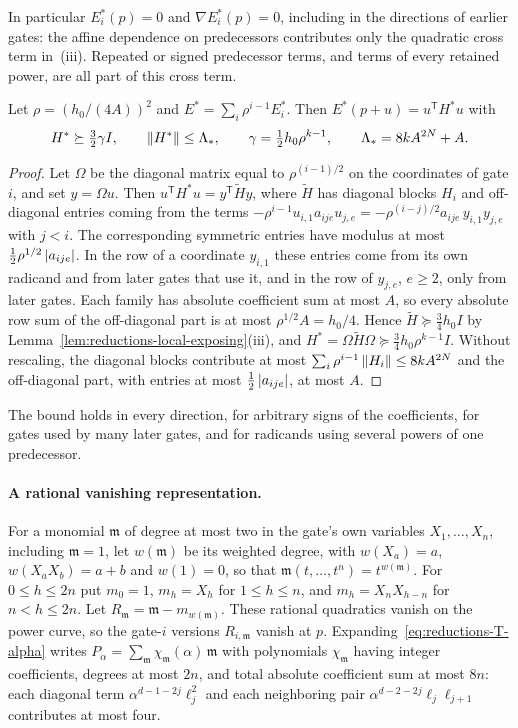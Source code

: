 In particular $E_i^*(p)=0$ and $\nabla E_i^*(p)=0$, including in the directions
of earlier gates: the affine dependence on predecessors contributes only the
quadratic cross term in~(iii). Repeated or signed predecessor terms, and terms
of every retained power, are all part of this cross term.

\begin{lemma}
\label{lem:reductions-coupled}
Let $\rho=(h_0/(4A))^2$ and $E^*=\sum_i\rho^{i-1}E_i^*$. Then
$E^*(p+u)=u^{\mathsf T}H^*u$ with
\[
 H^*\succeq\tfrac32\gamma I,\qquad \left\lVert H^*\right\rVert\le\Lambda_*,
 \qquad \gamma=\tfrac12h_0\rho^{k-1},\qquad \Lambda_*=8kA^{2N}+A.
\]
\end{lemma}

\begin{proof}
Let $\Omega$ be the diagonal matrix equal to $\rho^{(i-1)/2}$ on the coordinates
of gate $i$, and set $y=\Omega u$. Then $u^{\mathsf T}H^*u=y^{\mathsf T}\widetilde Hy$,
where $\widetilde H$ has diagonal blocks $H_i$ and off-diagonal entries coming
from the terms $-\rho^{i-1}u_{i,1}a_{ije}u_{j,e}=-\rho^{(i-j)/2}a_{ije}\,y_{i,1}y_{j,e}$
with $j<i$. The corresponding symmetric entries have modulus at most
$\frac12\rho^{1/2}\left\lvert a_{ije}\right\rvert$. In the row of a coordinate $y_{i,1}$ these
entries come from its own radicand and from later gates that use it, and in the
row of $y_{j,e}$, $e\ge2$, only from later gates. Each family has absolute
coefficient sum at most $A$, so every absolute row sum of the off-diagonal part
is at most $\rho^{1/2}A=h_0/4$. Hence $\widetilde H\succeq\frac34h_0I$ by
Lemma~\ref{lem:reductions-local-exposing}(iii), and
$H^*=\Omega\widetilde H\Omega\succeq\frac34h_0\rho^{k-1}I$. Without rescaling, the
diagonal blocks contribute at most $\sum_i\rho^{i-1}\left\lVert H_i\right\rVert\le8kA^{2N}$ and the
off-diagonal part, with entries at most $\frac12\left\lvert a_{ije}\right\rvert$, at most $A$.
\end{proof}

The bound holds in every direction, for arbitrary signs of the coefficients,
for gates used by many later gates, and for radicands using several powers of
one predecessor.

\paragraph{A rational vanishing representation.}
For a monomial $\mathfrak m$ of degree at most two in the gate's own variables
$X_1,\ldots,X_n$, including $\mathfrak m=1$, let $w(\mathfrak m)$ be its weighted
degree, with $w(X_a)=a$, $w(X_aX_b)=a+b$ and $w(1)=0$, so that
$\mathfrak m(t,\ldots,t^n)=t^{w(\mathfrak m)}$. For $0\le h\le2n$ put $m_0=1$,
$m_h=X_h$ for $1\le h\le n$, and $m_h=X_nX_{h-n}$ for $n<h\le2n$. Let
$R_{\mathfrak m}=\mathfrak m-m_{w(\mathfrak m)}$. These rational quadratics
vanish on the power curve, so the gate-$i$ versions $R_{i,\mathfrak m}$ vanish at
$p$. Expanding~\eqref{eq:reductions-T-alpha} writes
$P_\alpha=\sum_{\mathfrak m}\chi_{\mathfrak m}(\alpha)\,\mathfrak m$ with
polynomials $\chi_{\mathfrak m}$ having integer coefficients, degrees at most
$2n$, and total absolute coefficient sum at most $8n$: each diagonal term
$\alpha^{d-1-2j}\ell_j^2$ and each neighboring pair
$\alpha^{d-2-2j}\ell_j\ell_{j+1}$ contributes at most four.

